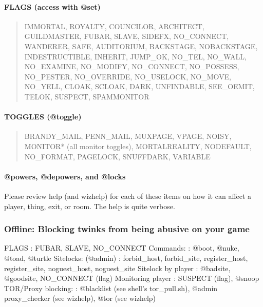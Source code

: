 \documentclass[letterpaper,10pt,english]{sphinxmanual}
\begin{document}
\paragraph{FLAGS (access with @set)}
\label{\detokenize{security:flags-access-with-set}}\begin{quote}

\sphinxAtStartPar
IMMORTAL, ROYALTY, COUNCILOR, ARCHITECT, GUILDMASTER,
FUBAR, SLAVE, SIDEFX, NO\_CONNECT, WANDERER, SAFE,
AUDITORIUM, BACKSTAGE, NOBACKSTAGE, INDESTRUCTIBLE,
INHERIT, JUMP\_OK, NO\_TEL, NO\_WALL, NO\_EXAMINE,
NO\_MODIFY, NO\_CONNECT, NO\_POSSESS, NO\_PESTER,
NO\_OVERRIDE, NO\_USELOCK, NO\_MOVE, NO\_YELL, CLOAK,
SCLOAK, DARK, UNFINDABLE, SEE\_OEMIT, TELOK, SUSPECT,
SPAMMONITOR
\end{quote}


\paragraph{TOGGLES (@toggle)}
\label{\detokenize{security:toggles-toggle}}\begin{quote}

\sphinxAtStartPar
BRANDY\_MAIL, PENN\_MAIL, MUXPAGE, VPAGE, NOISY,
MONITOR* (all monitor toggles), MORTALREALITY,
NODEFAULT, NO\_FORMAT, PAGELOCK, SNUFFDARK, VARIABLE
\end{quote}


\paragraph{@powers, @depowers, and @locks}
\label{\detokenize{security:powers-depowers-and-locks}}
\sphinxAtStartPar
Please review help (and wizhelp) for each of these items on how it can affect
a player, thing, exit, or room.  The help is quite verbose.


\subsubsection{Offline: Blocking twinks from being abusive on your game}
\label{\detokenize{security:offline-blocking-twinks-from-being-abusive-on-your-game}}
\sphinxAtStartPar
FLAGS                   : FUBAR, SLAVE, NO\_CONNECT
Commands:               : @boot, @nuke, @toad, @turtle
Sitelocks: (@admin)     : forbid\_host, forbid\_site, register\_host, register\_site, noguest\_host, noguest\_site
Sitelock by player      : @badsite, @goodsite, NO\_CONNECT (flag)
Monitoring player       : SUSPECT (flag), @snoop
TOR/Proxy blocking:     : @blacklist (see shell’s tor\_pull.sh), @admin proxy\_checker (see wizhelp), @tor (see wizhelp)
\end{document}
